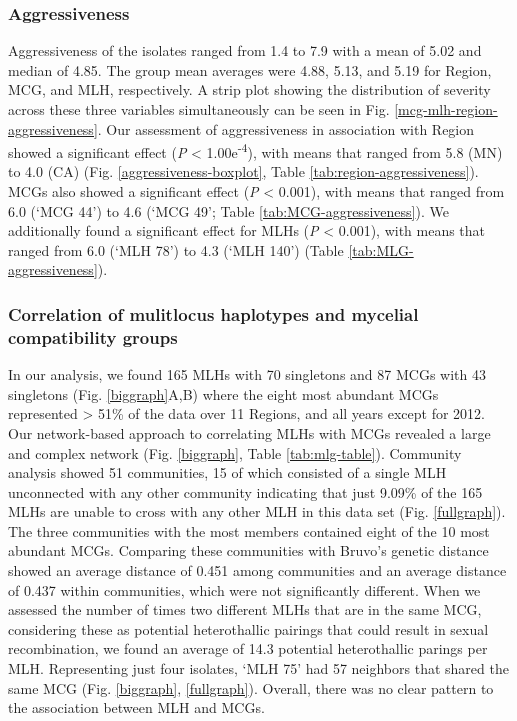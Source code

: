\subsubsection*{Aggressiveness}\label{aggressiveness-1}

Aggressiveness of the isolates ranged from 1.4 to 7.9 with a mean of
5.02 and median of 4.85. The group mean averages were 4.88, 5.13, and
5.19 for Region, MCG, and MLH, respectively. A strip plot showing the
distribution of severity across these three variables simultaneously can
be seen in Fig. \ref{mcg-mlh-region-aggressiveness}. Our assessment of
aggressiveness in association with Region showed a significant effect
(\emph{P} \textless{} 1.00e\textsuperscript{-4}), with means that ranged
from 5.8 (MN) to 4.0 (CA) (Fig. \ref{aggressiveness-boxplot}, Table
\ref{tab:region-aggressiveness}). MCGs also showed a significant effect
(\emph{P} \textless{} 0.001), with means that ranged from 6.0 (`MCG 44')
to 4.6 (`MCG 49'; Table \ref{tab:MCG-aggressiveness}). We additionally
found a significant effect for MLHs (\emph{P} \textless{} 0.001), with
means that ranged from 6.0 (`MLH 78') to 4.3 (`MLH 140') (Table
\ref{tab:MLG-aggressiveness}).

\subsubsection*{Correlation of mulitlocus haplotypes and mycelial
compatibility
groups}\label{correlation-of-mulitlocus-haplotypes-and-mycelial-compatibility-groups}

In our analysis, we found 165 MLHs with 70 singletons and 87 MCGs with
43 singletons (Fig. \ref{biggraph}A,B) where the eight most abundant
MCGs represented \textgreater{} 51\% of the data over 11 Regions, and
all years except for 2012. Our network-based approach to correlating
MLHs with MCGs revealed a large and complex network (Fig.
\ref{biggraph}, Table \ref{tab:mlg-table}). Community analysis showed 51
communities, 15 of which consisted of a single MLH unconnected with any
other community indicating that just 9.09\% of the 165 MLHs are unable
to cross with any other MLH in this data set (Fig. \ref{fullgraph}). The
three communities with the most members contained eight of the 10 most
abundant MCGs. Comparing these communities with Bruvo's genetic distance
showed an average distance of 0.451 among communities and an average
distance of 0.437 within communities, which were not significantly
different. When we assessed the number of times two different MLHs that
are in the same MCG, considering these as potential heterothallic
pairings that could result in sexual recombination, we found an average
of 14.3 potential heterothallic parings per MLH. Representing just four
isolates, `MLH 75' had 57 neighbors that shared the same MCG (Fig.
\ref{biggraph}, \ref{fullgraph}). Overall, there was no clear pattern to
the association between MLH and MCGs.

